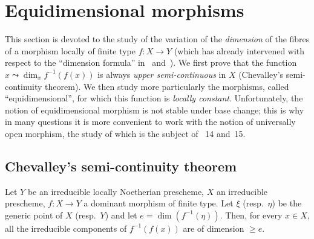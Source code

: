 \section{Equidimensional morphisms}
\label{section:IV.13}


This section is devoted to the study of the variation of the \emph{dimension} of the fibres of a morphism locally of finite type $f:X\to Y$ (which has already intervened with respect to the ``dimension formula'' in~ and~).
We first prove  that the function $x\leadsto\dim_x f^{-1}(f(x))$ is always \emph{upper semi-continuous} in $X$ (Chevalley's semi-continuity theorem).
We then study more particularly the morphisms, called ``equidimensional'', for which this function is \emph{locally constant}.
Unfortunately, the notion of equidimensional morphism is not stable under base change; this is why in many questions it is more convenient to work with the notion of universally open morphism, the study of which is the subject of \textsection\textsection~14 and~15.

\subsection{Chevalley's semi-continuity theorem}
\label{subsection:IV.13.1}

\begin{lemma}[13.1.1]
\label{IV.13.1.1}
Let $Y$ be an irreducible locally Noetherian prescheme, $X$ an irreducible prescheme, $f:X\to Y$ a dominant morphism of finite type.
Let $\xi$ \textup{(resp.\ $\eta$)} be the generic point of $X$ \textup{(resp.\ $Y$)} and let $e=\dim(f^{-1}(\eta))$.
Then, for every $x\in X$, all the irreducible components of $f^{-1}(f(x))$ are of dimension $\geq e$.
\end{lemma}

